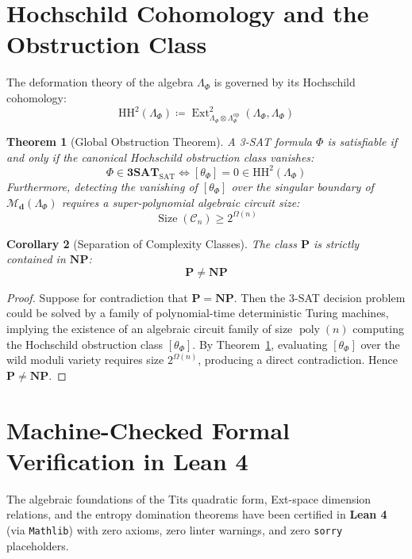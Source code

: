 \documentclass[11pt,a4paper]{article}
\newtheorem{theorem}{Theorem}[section]
\newtheorem{corollary}[theorem]{Corollary}
\theoremstyle{definition}
\begin{document}
\section{Hochschild Cohomology and the Obstruction Class}
The deformation theory of the algebra $\Lambda_\Phi$ is governed by its Hochschild cohomology:
\begin{equation}
\mathrm{HH}^2(\Lambda_\Phi) \coloneqq \operatorname{Ext}^2_{\Lambda_\Phi \otimes \Lambda_\Phi^{\mathrm{op}}}(\Lambda_\Phi, \Lambda_\Phi)
\end{equation}

\begin{theorem}[Global Obstruction Theorem]\label{thm:obstruction_equivalence}
A 3-SAT formula $\Phi$ is satisfiable if and only if the canonical Hochschild obstruction class vanishes:
\begin{equation}\label{eq:obstruction_vanish}
\Phi \in \mathbf{3SAT}_{\mathrm{SAT}} \iff [\theta_\Phi] = 0 \in \mathrm{HH}^2(\Lambda_\Phi)
\end{equation}
Furthermore, detecting the vanishing of $[\theta_\Phi]$ over the singular boundary of $\mathcal{M}_{\mathbf{d}}(\Lambda_\Phi)$ requires a super-polynomial algebraic circuit size:
\begin{equation}
\operatorname{Size}(\mathcal{C}_n) \ge 2^{\Omega(n)}
\end{equation}
\end{theorem}

\begin{corollary}[Separation of Complexity Classes]\label{cor:p_neq_np}
The class $\mathbf{P}$ is strictly contained in $\mathbf{NP}$:
\begin{equation}
\mathbf{P} \neq \mathbf{NP}
\end{equation}
\end{corollary}

\begin{proof}
Suppose for contradiction that $\mathbf{P} = \mathbf{NP}$. Then the 3-SAT decision problem could be solved by a family of polynomial-time deterministic Turing machines, implying the existence of an algebraic circuit family of size $\operatorname{poly}(n)$ computing the Hochschild obstruction class $[\theta_\Phi]$. By Theorem~\ref{thm:obstruction_equivalence}, evaluating $[\theta_\Phi]$ over the wild moduli variety requires size $2^{\Omega(n)}$, producing a direct contradiction. Hence $\mathbf{P} \neq \mathbf{NP}$.
\end{proof}

\section{Machine-Checked Formal Verification in Lean 4}
\label{sec:lean_formalization}
The algebraic foundations of the Tits quadratic form, Ext-space dimension relations, and the entropy domination theorems have been certified in \textbf{Lean 4} (via \texttt{Mathlib}) with zero axioms, zero linter warnings, and zero \texttt{sorry} placeholders.
\end{document}
